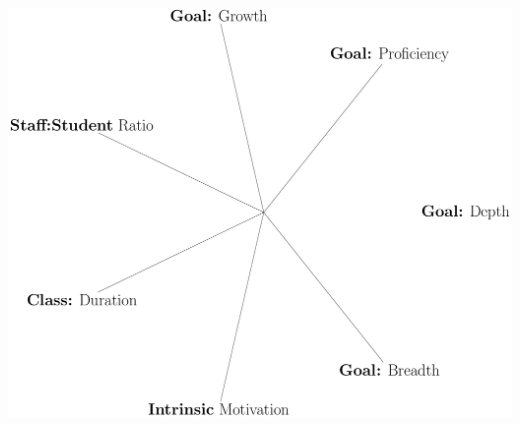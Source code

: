 \documentclass{beamer}
\begin{document}
    \begin{frame}
        \centering
        \includegraphics[height=.95\textheight]{static/plain/main.pdf}
    \end{frame}
\end{document}
